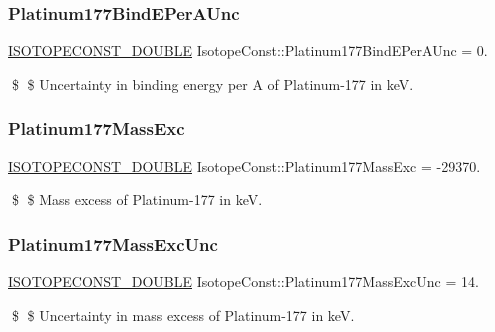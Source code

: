 \subsubsection{\texorpdfstring{Platinum177\+Bind\+E\+Per\+A\+Unc}{Platinum177BindEPerAUnc}}
{\footnotesize\ttfamily \mbox{\hyperlink{group___isotope_const-_macros_ga8f45a7272ce02c0b4c65c44636ed719a}{I\+S\+O\+T\+O\+P\+E\+C\+O\+N\+S\+T\+\_\+\+D\+O\+U\+B\+LE}} Isotope\+Const\+::\+Platinum177\+Bind\+E\+Per\+A\+Unc = 0.}

\$ \$ Uncertainty in binding energy per A of Platinum-\/177 in keV. \mbox{\label{group___isotope_const-_platinum-_pt177_ga1259077c8e73c0061dbdaef19f660cff}} 
\subsubsection{\texorpdfstring{Platinum177\+Mass\+Exc}{Platinum177MassExc}}
{\footnotesize\ttfamily \mbox{\hyperlink{group___isotope_const-_macros_ga8f45a7272ce02c0b4c65c44636ed719a}{I\+S\+O\+T\+O\+P\+E\+C\+O\+N\+S\+T\+\_\+\+D\+O\+U\+B\+LE}} Isotope\+Const\+::\+Platinum177\+Mass\+Exc = -\/29370.}

\$ \$ Mass excess of Platinum-\/177 in keV. \mbox{\label{group___isotope_const-_platinum-_pt177_ga3ef79986b51c4b9887ed40c27a7f62d1}} 
\subsubsection{\texorpdfstring{Platinum177\+Mass\+Exc\+Unc}{Platinum177MassExcUnc}}
{\footnotesize\ttfamily \mbox{\hyperlink{group___isotope_const-_macros_ga8f45a7272ce02c0b4c65c44636ed719a}{I\+S\+O\+T\+O\+P\+E\+C\+O\+N\+S\+T\+\_\+\+D\+O\+U\+B\+LE}} Isotope\+Const\+::\+Platinum177\+Mass\+Exc\+Unc = 14.}

\$ \$ Uncertainty in mass excess of Platinum-\/177 in keV. \mbox{\label{group___isotope_const-_platinum-_pt177_ga8fc8e184a34575f93d9ce1f66837faae}} 
